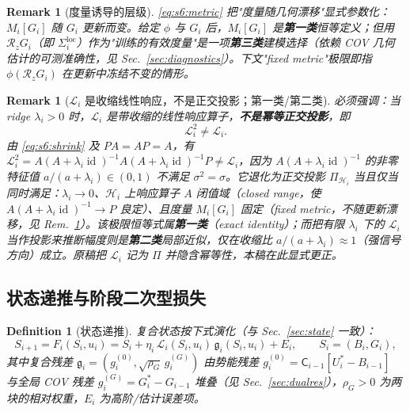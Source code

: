 \documentclass[11pt,a4paper]{article}
\newtheorem{definition}[theorem]{Definition}
\newtheorem{remark}[theorem]{Remark}
\DeclareMathOperator{\id}{id}
\newcommand{\cH}{\mathcal{H}}   %
\newcommand{\cL}{\mathcal{L}}   %
\newcommand{\Rstr}{\mathcal{R}}     %
\newcommand{\Center}{\mathsf{C}}    %
\newcommand{\ProjectOp}{\Pi}        %
\newcommand{\gres}{\bm{\mathfrak{g}}} %
\begin{document}
\begin{remark}[度量诱导的层级]\label{rem:s6:tier-metric}
\eqref{eq:s6:metric} 把"度量随几何漂移"显式参数化：$M_i[G_i]$ 随 $G_i$ 更新而变。给定 $\phi$ 与 $G_i$ 后，$M_i[G_i]$ 是\textbf{第一类}恒等定义；但用 $\Rstr_z G_i$（即 $\Sigma_i^{\mathrm{loc}}$）作为"训练的有效度量"是一项\textbf{第三类}建模选择（依赖 COV 几何估计的可测准确性，见 Sec.~\ref{sec:diagnostics}）。下文"fixed metric"极限即指 $\phi(\Rstr_z G_i)$ 在更新中冻结不变的情形。
\end{remark}

\begin{remark}[$\cL_i$ 是收缩线性响应，不是正交投影；第一类/第二类]\label{rem:s6:notprojection}
必须强调：当 ridge $\lambda_i>0$ 时，$\cL_i$ 是\emph{带收缩的线性响应算子}，\textbf{不是幂等正交投影}，即
\begin{equation}\label{eq:s6:nonidem}
\cL_i^2\neq\cL_i .
\end{equation}
由 \eqref{eq:s6:shrink} 及 $PA=AP=A$，有 $\cL_i^2=A(A+\lambda_i\id)^{-1}A(A+\lambda_i\id)^{-1}P\neq\cL_i$，因为 $A(A+\lambda_i\id)^{-1}$ 的非零特征值 $a/(a+\lambda_i)\in(0,1)$ 不满足 $\sigma^2=\sigma$。它退化为正交投影 $\ProjectOp_{\cH_i}$ 当且仅当同时满足：$\lambda_i\to 0$、$\cH_i$ 上响应算子 $A$ 闭值域（closed range，使 $A(A+\lambda_i\id)^{-1}\to P$ 良定）、且度量 $M_i[G_i]$ 固定（fixed metric，不随更新漂移，见 Rem.~\ref{rem:s6:tier-metric}）。该极限恒等式属\textbf{第一类}（exact identity）；而把有限 $\lambda_i$ 下的 $\cL_i$ 当作投影来推断幅度则是\textbf{第二类}局部近似，仅在收缩比 $a/(a+\lambda_i)\approx 1$（强信号方向）成立。原稿把 $\cL_i$ 记为 $\ProjectOp$ 并隐含幂等性，本稿在此显式更正。
\end{remark}

\subsection{状态递推与阶段二次型损失}

\begin{definition}[状态递推]\label{def:s6:recursion}
复合状态按下式演化（与 Sec.~\ref{sec:state} 一致）：
\begin{equation}\label{eq:s6:recursion}
S_{i+1}=F_i(S_i,u_i)=S_i+\eta_i\,\cL_i(S_i,u_i)\,\gres_i(S_i,u_i)+E_i,\qquad S_i=(B_i,G_i),
\end{equation}
其中复合残差 $\gres_i=(g_i^{(0)},\sqrt{\rho_G}\,g_i^{(G)})$ 由势能残差 $g_i^{(0)}=\Center_{i-1}[U_i^*-B_{i-1}]$ 与全局 COV 残差 $g_i^{(G)}=G_i^*-G_{i-1}$ 堆叠（见 Sec.~\ref{sec:dualres}），$\rho_G>0$ 为两块的相对权重，$E_i$ 为高阶/估计误差项。
\end{definition}
\end{document}
